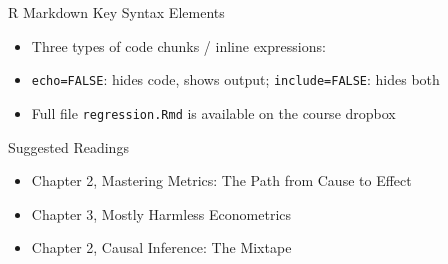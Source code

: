 \documentclass[dvipsnames,hyperref={pdfpagelabels=false}]{beamer}
\begin{document}
\begin{frame}[fragile]{R Markdown Key Syntax Elements}

	\begin{itemize}
		\item Three types of code chunks / inline expressions:
	\end{itemize}

	\vspace{0.2cm}


	\vspace{0.3cm}

	\begin{itemize}
		\item \texttt{echo=FALSE}: hides code, shows output; \texttt{include=FALSE}: hides both
		\vspace{0.2cm}
		\item Full file \texttt{regression.Rmd} is available on the course dropbox
	\end{itemize}

\end{frame}


\begin{frame}{Suggested Readings}
	\begin{itemize} 
		\item Chapter 2, Mastering Metrics: The Path from Cause to Effect
		\vspace{0.2cm}
		\item Chapter 3, Mostly Harmless Econometrics
		\vspace{0.2cm}
		\item Chapter 2, Causal Inference: The Mixtape
	\end{itemize}
\end{frame}
\end{document}
